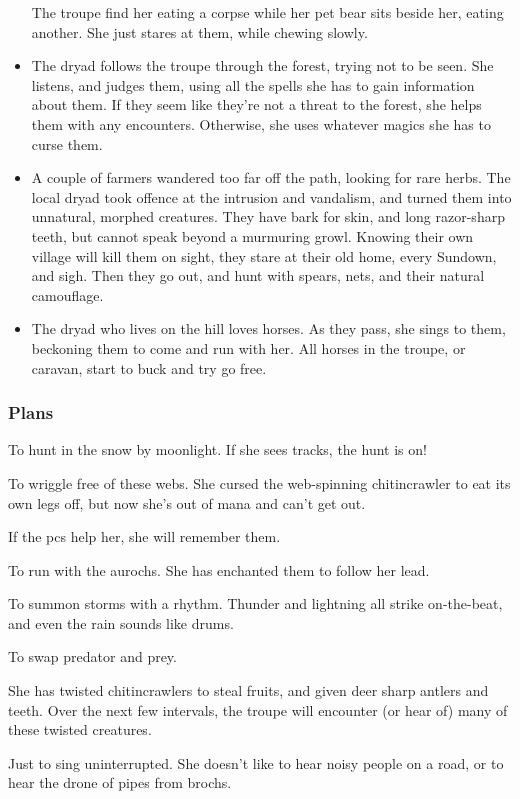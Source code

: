 \begin{multicols}{2}
\begin{itemize}
  The troupe find her eating a corpse while her pet bear sits beside her, eating another.
  She just stares at them, while chewing slowly.
  \item
  The dryad follows the troupe through the forest, trying not to be seen.
  She listens, and judges them, using all the spells she has to gain information about them.
  If they seem like they're not a threat to the forest, she helps them with any encounters.
  Otherwise, she uses whatever magics she has to curse them.
  \item
  A couple of farmers wandered too far off the path, looking for rare herbs.
  The local dryad took offence at the intrusion and vandalism, and turned them into unnatural, morphed creatures.
  They have bark for skin, and long razor-sharp teeth, but cannot speak beyond a murmuring growl.
  Knowing their own \gls{village} will kill them on sight, they stare at their old home, every Sundown, and sigh.
  Then they go out, and hunt with spears, nets, and their natural camouflage.
  \item
  The dryad who lives on the hill loves horses.
  As they pass, she sings to them, beckoning them to come and run with her.
  All horses in the troupe, or caravan, start to buck and try go free.
\end{itemize}

\subsubsection{Plans}


\begin{dlist}
  \addtocounter{enumi}{-1}
  \item
  To hunt in the snow by moonlight.
  If she sees tracks, the hunt is on!
  \item
  To wriggle free of these webs.
  She cursed the web-spinning chitincrawler to eat its own legs off, but now she's out of mana and can't get out.

  If the \glspl{pc} help her, she will remember them.
  \item
  To run with the aurochs.
  She has enchanted them to follow her lead.
  \item
  To summon storms with a rhythm.
  Thunder and lightning all strike on-the-beat, and even the rain sounds like drums.
  \item
  To swap predator and prey.

  She has twisted chitincrawlers to steal fruits, and given deer sharp antlers and teeth.
  Over the next few \glspl{interval}, the troupe will encounter (or hear of) many of these twisted creatures.
  \item
  Just to sing uninterrupted.
  She doesn't like to hear noisy people on a road, or to hear the drone of pipes from \glspl{broch}.


\end{dlist}
\end{multicols}
